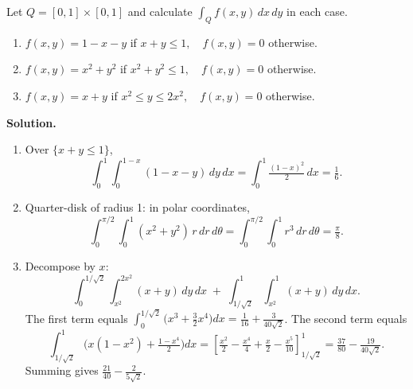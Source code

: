 \begin{problembox}
Let \( Q = [0, 1] \times [0, 1] \) and calculate \( \int_{Q} f(x, y) \, dx \, dy \) in each case.
\begin{enumerate}[label=(\alph*)]
    \item \( f(x, y) = 1 - x - y \) if \( x + y \leq 1, \quad f(x, y) = 0 \) otherwise.
    \item \( f(x, y) = x^2 + y^2 \) if \( x^2 + y^2 \leq 1, \quad f(x, y) = 0 \) otherwise.
    \item \( f(x, y) = x + y \) if \( x^2 \leq y \leq 2x^2, \quad f(x, y) = 0 \) otherwise.
\end{enumerate}
\end{problembox}

\noindent\textbf{Solution.}
\begin{enumerate}[label=(\alph*)]
    \item Over $\{x+y\le 1\}$,
    \[ \int_0^1 \!\int_0^{1-x} (1-x-y)\,dy\,dx = \int_0^1 \tfrac{(1-x)^2}{2}\,dx = \tfrac{1}{6}. \]
    \item Quarter-disk of radius 1: in polar coordinates,
    \[ \int_0^{\pi/2}\!\int_0^1 (x^2+y^2)\,r\,dr\,d\theta = \int_0^{\pi/2}\!\int_0^1 r^3\,dr\,d\theta = \tfrac{\pi}{8}. \]
    \item Decompose by $x$:
    \[ \int_0^{1/\sqrt{2}} \!\int_{x^2}^{2x^2} (x+y)\,dy\,dx\; +\; \int_{1/\sqrt{2}}^{1} \!\int_{x^2}^{1} (x+y)\,dy\,dx. \]
    The first term equals $\int_0^{1/\sqrt{2}} \big(x^3+\tfrac{3}{2}x^4\big)dx= \tfrac{1}{16}+\tfrac{3}{40\sqrt{2}}$. The second term equals
    \[ \int_{1/\sqrt{2}}^{1} \Big(x(1-x^2)+\tfrac{1-x^4}{2}\Big)dx = \left[\tfrac{x^2}{2}-\tfrac{x^4}{4}+\tfrac{x}{2}-\tfrac{x^5}{10}\right]_{1/\sqrt{2}}^{1} = \tfrac{37}{80}-\tfrac{19}{40\sqrt{2}}. \]
    Summing gives $\tfrac{21}{40}-\tfrac{2}{5\sqrt{2}}$.
\end{enumerate}


